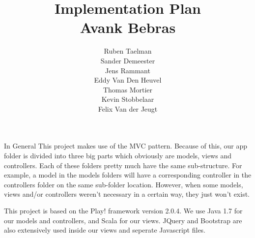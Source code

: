 \documentclass[]{article}
\author{
    Ruben Taelman \\
    Sander Demeester \\
    Jens Rammant \\
    Eddy Van Den Heuvel \\
    Thomas Mortier \\
    Kevin Stobbelaar \\
    Felix Van der Jeugt
}
\title{
    Implementation Plan \\
    Avank Bebras
}
\begin{document}
\maketitle

\tableofcontents
\clearpage

\begin{section}{In General}
    This project makes use of the MVC pattern. Because of this, our app folder is divided
    into three big parts which obviously are models, views and controllers. Each of these
    folders pretty much have the same sub-structure. For example, a model in the models
    folders will have a corresponding controller in the controllers folder on the same
    sub-folder location. However, when some models, views and/or controllers weren't
    necessary in a certain way, they just won't exist.
    
    This project is based on the Play! framework version 2.0.4. We use Java 1.7 for our
    models and controllers, and Scala for our views. JQuery and Bootstrap are also
    extensively used inside our views and seperate Javascript files.
\end{section}
\end{document}
